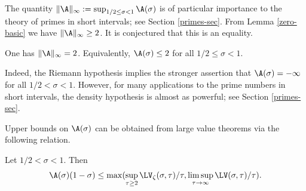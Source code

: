 The quantity $\|\A\|_\infty := \sup_{1/2 \leq \sigma < 1} \A(\sigma)$ is of particular importance to the theory of primes in short intervals; see Section \ref{primes-sec}.  From Lemma \ref{zero-basic} we have $\|\A\|_\infty \geq 2$.  It is conjectured that this is an equality.

\begin{conjecture}\label{density-hypothesis}  One has $\|\A\|_\infty=2$.  Equivalently, $\A(\sigma) \leq 2$ for all $1/2 \leq \sigma < 1$.
\end{conjecture}

Indeed, the Riemann hypothesis implies the stronger assertion that $\A(\sigma) = -\infty$ for all $1/2 < \sigma < 1$.  However, for many applications to the prime numbers in short intervals, the density hypothesis is almost as powerful; see Section \ref{primes-sec}.

Upper bounds on $\A(\sigma)$ can be obtained from large value theorems via the following relation.

\begin{lemma}\label{zero-from-large}  Let $1/2 < \sigma < 1$.  Then
$$ \A(\sigma)(1-\sigma) \leq \max( \sup_{\tau \geq 2} \LV_\zeta(\sigma,\tau)/\tau, \limsup_{\tau \to \infty} \LV(\sigma,\tau)/\tau ).$$
\end{lemma}

